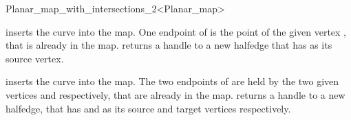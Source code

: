 \begin{ccRefClass}{Planar_map_with_intersections_2<Planar_map>}
\begin{ccAdvanced}
  {inserts the curve  into the map. One endpoint of 
  is the point of the given vertex , that is already in the
  map.  returns a handle to a
  new halfedge that has  as its source vertex.
  }
  
  {inserts the curve  into the map. The two endpoints of
   are held by the two given vertices  and 
  respectively, that are already in the
  map.  returns a handle to
  a new halfedge, that has  and  as its source and
  target vertices respectively.
  }

\end{ccAdvanced}

\end{ccRefClass}

\ccRefPageEnd

